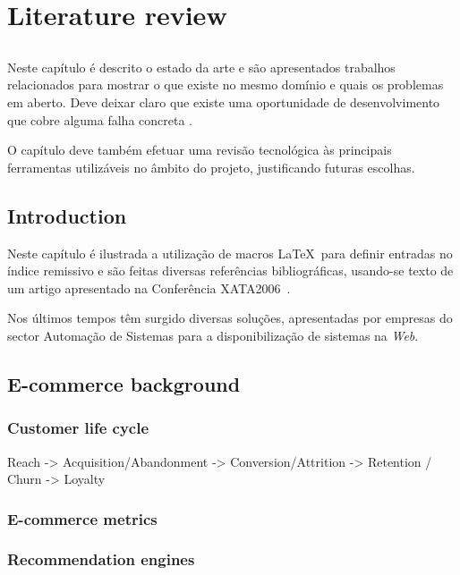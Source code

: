 \chapter{Literature review} \label{chap:sota}

\section*{}

Neste capítulo é descrito o estado da arte e são
apresentados trabalhos relacionados para mostrar o que existe no
mesmo domínio e quais os problemas em aberto.
Deve deixar claro que existe uma oportunidade de desenvolvimento que
cobre alguma falha concreta .

O capítulo deve também efetuar uma revisão tecnológica às principais
ferramentas utilizáveis no âmbito do projeto, justificando futuras
escolhas.

\section{Introduction}

Neste capítulo é ilustrada a utilização de macros \LaTeX\ para definir
entradas no índice remissivo e são feitas diversas referências
bibliográficas, usando-se texto de um artigo apresentado na Conferência 
XATA2006~\cite{kn:MVL06-xata}.

Nos últimos tempos têm surgido diversas soluções, apresentadas por
empresas do sector Automação de Sistemas para a disponibilização de
sistemas \scadadms{} na \textit{Web}.

\section{E-commerce background}

\subsection{Customer life cycle}

Reach -> Acquisition/Abandonment -> Conversion/Attrition -> Retention / Churn -> Loyalty

\subsection{E-commerce metrics}

\cite{Sterne2000}

\subsection{Recommendation engines}

